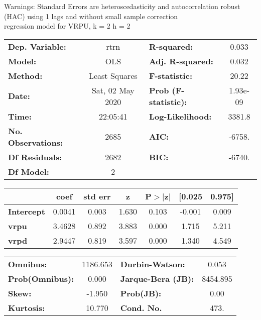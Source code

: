 Warnings: \newline
 [1] Standard Errors are heteroscedasticity and autocorrelation robust (HAC) using 1 lags and without small sample correction\\ 

regression model for VRPU, k = 2 h = 2\begin{center}
\begin{tabular}{lclc}
\toprule
\textbf{Dep. Variable:}    &       rtrn       & \textbf{  R-squared:         } &     0.033   \\
\textbf{Model:}            &       OLS        & \textbf{  Adj. R-squared:    } &     0.032   \\
\textbf{Method:}           &  Least Squares   & \textbf{  F-statistic:       } &     20.22   \\
\textbf{Date:}             & Sat, 02 May 2020 & \textbf{  Prob (F-statistic):} &  1.93e-09   \\
\textbf{Time:}             &     22:05:41     & \textbf{  Log-Likelihood:    } &    3381.8   \\
\textbf{No. Observations:} &        2685      & \textbf{  AIC:               } &    -6758.   \\
\textbf{Df Residuals:}     &        2682      & \textbf{  BIC:               } &    -6740.   \\
\textbf{Df Model:}         &           2      & \textbf{                     } &             \\
\bottomrule
\end{tabular}
\begin{tabular}{lcccccc}
                   & \textbf{coef} & \textbf{std err} & \textbf{z} & \textbf{P$> |$z$|$} & \textbf{[0.025} & \textbf{0.975]}  \\
\midrule
\textbf{Intercept} &       0.0041  &        0.003     &     1.630  &         0.103        &       -0.001    &        0.009     \\
\textbf{vrpu}      &       3.4628  &        0.892     &     3.883  &         0.000        &        1.715    &        5.211     \\
\textbf{vrpd}      &       2.9447  &        0.819     &     3.597  &         0.000        &        1.340    &        4.549     \\
\bottomrule
\end{tabular}
\begin{tabular}{lclc}
\textbf{Omnibus:}       & 1186.653 & \textbf{  Durbin-Watson:     } &    0.053  \\
\textbf{Prob(Omnibus):} &   0.000  & \textbf{  Jarque-Bera (JB):  } & 8454.895  \\
\textbf{Skew:}          &  -1.950  & \textbf{  Prob(JB):          } &     0.00  \\
\textbf{Kurtosis:}      &  10.770  & \textbf{  Cond. No.          } &     473.  \\
\bottomrule
\end{tabular}
\end{center}

